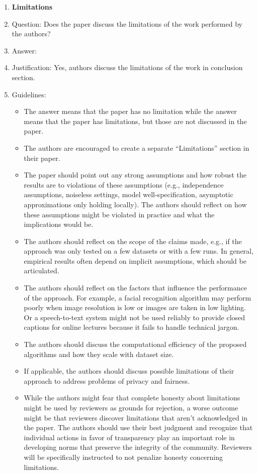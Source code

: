 \documentclass{article}
\theoremstyle{definition}
\theoremstyle{remark}
\begin{document}
\begin{enumerate}
\item {\bf Limitations}
    \item[] Question: Does the paper discuss the limitations of the work performed by the authors?
    \item[] Answer: \answerYes{} %
    \item[] Justification: Yes, authors  discuss the limitations of the work in conclusion section.
    \item[] Guidelines:
    \begin{itemize}
        \item The answer \answerNA{} means that the paper has no limitation while the answer \answerNo{} means that the paper has limitations, but those are not discussed in the paper. 
        \item The authors are encouraged to create a separate ``Limitations'' section in their paper.
        \item The paper should point out any strong assumptions and how robust the results are to violations of these assumptions (e.g., independence assumptions, noiseless settings, model well-specification, asymptotic approximations only holding locally). The authors should reflect on how these assumptions might be violated in practice and what the implications would be.
        \item The authors should reflect on the scope of the claims made, e.g., if the approach was only tested on a few datasets or with a few runs. In general, empirical results often depend on implicit assumptions, which should be articulated.
        \item The authors should reflect on the factors that influence the performance of the approach. For example, a facial recognition algorithm may perform poorly when image resolution is low or images are taken in low lighting. Or a speech-to-text system might not be used reliably to provide closed captions for online lectures because it fails to handle technical jargon.
        \item The authors should discuss the computational efficiency of the proposed algorithms and how they scale with dataset size.
        \item If applicable, the authors should discuss possible limitations of their approach to address problems of privacy and fairness.
        \item While the authors might fear that complete honesty about limitations might be used by reviewers as grounds for rejection, a worse outcome might be that reviewers discover limitations that aren't acknowledged in the paper. The authors should use their best judgment and recognize that individual actions in favor of transparency play an important role in developing norms that preserve the integrity of the community. Reviewers will be specifically instructed to not penalize honesty concerning limitations.
    \end{itemize}


\end{enumerate}
\end{document}
